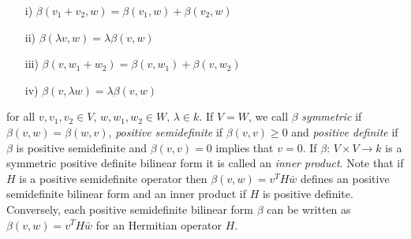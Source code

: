 \begin{enumerate}
	\item [i)] $\beta(v_1+v_2,w) = \beta(v_1,w) + \beta(v_2,w)  $
	\item  [ii)]$\beta(\lambda v,w)= \lambda \beta(v,w) $
	\item [iii)]$ \beta(v,w_1+w_2) = \beta(v,w_1)+ \beta(v,w_2) $
	\item [iv)]$ \beta(v,\lambda w) = \lambda\beta(v,w) $
\end{enumerate}
for all $ v,v_1,v_2 \in V, \, w,w_1,w_2 \in W, \, \lambda \in k $. 
If $ V = W $, we call $ \beta $ {\itshape symmetric} if $ \beta(v,w) = \beta(w,v) $, {\itshape positive semidefinite} if 
$ \beta(v,v) \ge 0 $ and {\itshape positive definite} if $ \beta $ is positive semidefinite and $ \beta(v,v)= 0 $ implies that $ v = 0 $. 
If $ \beta: \, V \times V \to k $ is a symmetric positive definite bilinear form it is called an {\itshape inner product}.
Note that if $ H $ is a positive semidefinite operator then $ \beta(v,w) = v^TH\bar{w} $ defines an positive semidefinite bilinear form and an inner product if $ H $ is positive definite. 
Conversely, each positive semidefinite bilinear form $ \beta $ can be written as $ \beta(v,w) = v^TH\bar{w} $ for an Hermitian operator $ H $.

